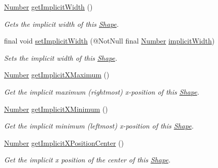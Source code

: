 \begin{DoxyCompactItemize}
\hyperlink{interfacecom_1_1aarrelaakso_1_1drawl_1_1_number}{Number} \hyperlink{classcom_1_1aarrelaakso_1_1drawl_1_1_shape_af8182545b3b1c85ecaee849474f63c6b}{get\+Implicit\+Width} ()
\begin{DoxyCompactList}\small\item\em Gets the implicit width of this \hyperlink{classcom_1_1aarrelaakso_1_1drawl_1_1_shape}{Shape}. \end{DoxyCompactList}\item 
final void \hyperlink{classcom_1_1aarrelaakso_1_1drawl_1_1_shape_acc3e365064b5d4f719ac920a5a70aedb}{set\+Implicit\+Width} (@Not\+Null final \hyperlink{interfacecom_1_1aarrelaakso_1_1drawl_1_1_number}{Number} \hyperlink{classcom_1_1aarrelaakso_1_1drawl_1_1_shape_a06c9063aa0b51139910e23414428c9d6}{implicit\+Width})
\begin{DoxyCompactList}\small\item\em Sets the implicit width of this \hyperlink{classcom_1_1aarrelaakso_1_1drawl_1_1_shape}{Shape}. \end{DoxyCompactList}\item 
\hyperlink{interfacecom_1_1aarrelaakso_1_1drawl_1_1_number}{Number} \hyperlink{classcom_1_1aarrelaakso_1_1drawl_1_1_shape_a0903079fd35e3cfdd6cdc299548a9680}{get\+Implicit\+X\+Maximum} ()
\begin{DoxyCompactList}\small\item\em Get the implicit maximum (rightmost) x-\/position of this \hyperlink{classcom_1_1aarrelaakso_1_1drawl_1_1_shape}{Shape}. \end{DoxyCompactList}\item 
\hyperlink{interfacecom_1_1aarrelaakso_1_1drawl_1_1_number}{Number} \hyperlink{classcom_1_1aarrelaakso_1_1drawl_1_1_shape_a264da8a94218b09267c2e177ff0b0951}{get\+Implicit\+X\+Minimum} ()
\begin{DoxyCompactList}\small\item\em Get the implicit minimum (leftmost) x-\/position of this \hyperlink{classcom_1_1aarrelaakso_1_1drawl_1_1_shape}{Shape}. \end{DoxyCompactList}\item 
\hyperlink{interfacecom_1_1aarrelaakso_1_1drawl_1_1_number}{Number} \hyperlink{classcom_1_1aarrelaakso_1_1drawl_1_1_shape_a9632097be62eb03e09145763852bda85}{get\+Implicit\+X\+Position\+Center} ()
\begin{DoxyCompactList}\small\item\em Get the implicit x position of the center of this \hyperlink{classcom_1_1aarrelaakso_1_1drawl_1_1_shape}{Shape}. \end{DoxyCompactList}\item 

\end{DoxyCompactItemize}
